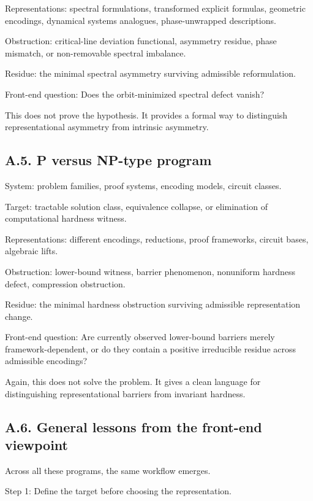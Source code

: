 \documentclass[
]{article}
\begin{document}
Representations: spectral formulations, transformed explicit formulas,
geometric encodings, dynamical systems analogues, phase-unwrapped
descriptions.

Obstruction: critical-line deviation functional, asymmetry residue,
phase mismatch, or non-removable spectral imbalance.

Residue: the minimal spectral asymmetry surviving admissible
reformulation.

Front-end question: Does the orbit-minimized spectral defect vanish?

This does not prove the hypothesis. It provides a formal way to
distinguish representational asymmetry from intrinsic asymmetry.

\subsection{A.5. P versus NP-type
program}\label{a.5.-p-versus-np-type-program}

System: problem families, proof systems, encoding models, circuit
classes.

Target: tractable solution class, equivalence collapse, or elimination
of computational hardness witness.

Representations: different encodings, reductions, proof frameworks,
circuit bases, algebraic lifts.

Obstruction: lower-bound witness, barrier phenomenon, nonuniform
hardness defect, compression obstruction.

Residue: the minimal hardness obstruction surviving admissible
representation change.

Front-end question: Are currently observed lower-bound barriers merely
framework-dependent, or do they contain a positive irreducible residue
across admissible encodings?

Again, this does not solve the problem. It gives a clean language for
distinguishing representational barriers from invariant hardness.

\subsection{A.6. General lessons from the front-end
viewpoint}\label{a.6.-general-lessons-from-the-front-end-viewpoint}

Across all these programs, the same workflow emerges.

Step 1: Define the target before choosing the representation.
\end{document}
